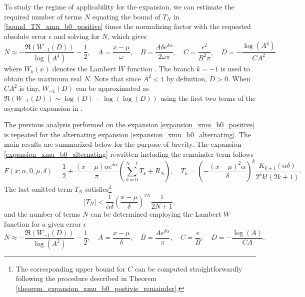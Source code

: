 \documentclass[10pt,a4paper,oneside]{article}
\numberwithin{equation}{section}
\begin{document}
To study the regime of applicability for the expansion, we can estimate the required number of terms $N$ equating the bound of $T_N$ in \eqref{bound_TN_xmu_b0_positive} times the normalizing factor with the requested absolute error $\epsilon$ and solving for $N$, which gives
\begin{equation}\label{N_expansion_xmu_b0_positive}
N \approx -\frac{\Re(W_{-1}(D))}{\log(A^4)} - \frac{1}{2}, \quad A = \frac{x-\mu}{\omega}, \quad B = \frac{A\delta e^{\delta \alpha}}{2\omega\pi}, \quad C = \frac{\epsilon^2}{B^2 \pi}, \quad D = -\frac{\log(A^4)}{C A^2}
\end{equation}
where $W_k(x)$ denotes the Lambert $W$ function \cite[\S 4.13]{NIST:DLMF}. The branch $k=-1$ is used to obtain the maximum real $N$. Note that since $A^2 < 1$ by definition, $D > 0$. When $C A^2$ is tiny, $W_{-1}(D)$ can be approximated as $\Re(W_{-1}(D)) \sim \log(D) - \log(\log(D))$ using the first two terms of the asymptotic expansion in \cite[\S 4.13.10]{NIST:DLMF}.

The previous analysis performed on the expansion \eqref{expansion_xmu_b0_positive} is repeated for the alternating expansion \eqref{expansion_xmu_b0_alternating}. The main results are summarized below for the purpose of brevity. The expansion \eqref{expansion_xmu_b0_alternating} rewritten including the remainder term follows
\begin{equation}
F(x; \alpha, 0, \mu, \delta) = \frac{1}{2} + \frac{(x-\mu)\alpha e^{\delta \alpha}}{\pi} \left( \sum_{k=0}^{N-1} T_k + R_N\right),  \quad T_k = \left(-\frac{(x-\mu)^2 \alpha}{\delta}\right)^k \frac{K_{k+1}(\alpha \delta)}{2^k k! (2k + 1)}.
\end{equation}
The last omitted term $T_N$ satisfies\footnote{The corresponding upper bound for $C$ can be computed straightforwardly following the procedure described in Theorem \ref{theorem_expansion_xmu_b0_postivie_remainder}.}
\begin{equation}
|T_N| < \frac{1}{\alpha \delta} \left(\frac{x-\mu}{\delta}\right)^{2N} \frac{1}{2N + 1},
\end{equation} 
and the number of terms $N$ can be determined employing the Lambert $W$ function for a given error $\epsilon$
\begin{equation}
N \approx -\frac{\Re(W_{-1}(D))}{\log(A^2)} - \frac{1}{2}, \quad A = \frac{x-\mu}{\delta}, \quad B = \frac{A e^{\delta \alpha}}{\pi}, \quad C = \frac{\epsilon}{B}, \quad D = -\frac{\log(A)}{CA}.
\end{equation}
\end{document}
